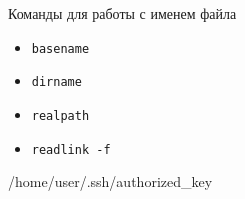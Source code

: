 \begin{frame}[fragile]{Команды для работы с именем файла}
      \begin{itemize}
		  \item {\tt basename }
		  \item {\tt dirname }
		  \item {\tt realpath} 
		  \item {\tt readlink -f }
      \end{itemize}
        /home/user/.ssh/authorized\_key
\end{frame}
